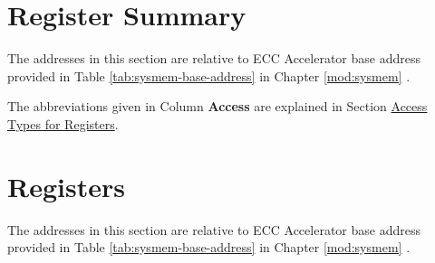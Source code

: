 \documentclass[main\_\_EN.tex]{subfiles}
\begin{document}



\clearpage
\hypertarget{ecc-reg-summ}{}
\section{Register Summary}
\label{sec:ecc-reg-summ}

The addresses in this section are relative to ECC Accelerator base address provided in Table \ref{tab:sysmem-base-address} in Chapter \ref{mod:sysmem} \textit{}.

The abbreviations given in Column \textbf{Access} are explained in Section \hyperref[glossary-access-types]{Access Types for Registers}.






\clearpage
\section{Registers}

The addresses in this section are relative to ECC Accelerator base address provided in Table \ref{tab:sysmem-base-address} in Chapter \ref{mod:sysmem} \textit{}.


\end{document}
